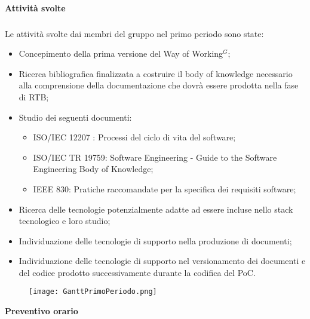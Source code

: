 \paragraph{Attività svolte} 
\subparagraph{}
Le attività svolte dai membri del gruppo nel primo periodo sono state:
\begin{itemize}
    \item Concepimento della prima versione del Way of Working$^{G}$;
    \item Ricerca bibliografica finalizzata a costruire il body of knowledge necessario alla comprensione della documentazione
    che dovrà essere prodotta nella fase di RTB;
    \item Studio dei seguenti documenti:
    \begin{itemize}
        \item ISO/IEC 12207 : Processi del ciclo di vita del software;
        \item ISO/IEC TR 19759: Software Engineering - Guide to the Software Engineering Body of Knowledge; 
        \item IEEE 830: Pratiche raccomandate per la specifica dei requisiti software;
    \end{itemize}
    \item Ricerca delle tecnologie potenzialmente adatte ad essere incluse nello
    stack tecnologico e loro studio;
    \item Individuazione delle tecnologie di supporto nella produzione di documenti; 
    \item Individuazione delle tecnologie di supporto nel versionamento dei documenti e del codice prodotto
    successivamente durante la codifica del PoC.
\end{itemize}

\graphicspath{ {./src/Gantt/} } 

\begin{figure}[h] \texttt{[image: GanttPrimoPeriodo.png]} \end{figure}

\textbf{Preventivo orario}

